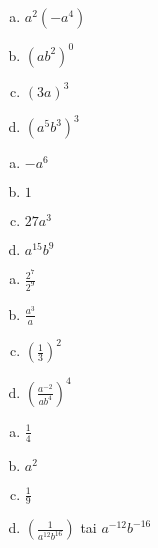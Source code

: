 \begin{tehtavasivu}
        
    \begin{tehtava}%
        \begin{enumerate}[a)]
        	\item $a^2(-a^4) $ 
        	\item $(ab^2)^0$ 
        	\item $(3a)^3$ 
        	\item $(a^5b^3)^3$
		\end{enumerate}        
        \begin{vastaus}
        \begin{enumerate}[a)]
            \item $-a^6$ 
            \item $1$ 
            \item $27a^3$ 
            \item $a^{15}b^9$
        \end{enumerate}
        \end{vastaus}
    \end{tehtava} 
    
    \begin{tehtava}%
        \begin{enumerate}[a)]
        	\item $\frac{2^7}{2^9}$ 
        	\item $\frac{a^3}{a}$ 
        	\item $\left(\frac{1}{3}\right)^2$ 
        	\item $\left(\frac{a^{-2}}{ab^4}\right)^4$
		\end{enumerate}        
        \begin{vastaus}
        \begin{enumerate}[a)]
            \item $\frac{1}{4}$ 
            \item $a^2$ 
            \item $\frac{1}{9} $ 
            \item $ \left(\frac{1}{a^{12}b^{16}}\right)$ tai $a^{-12}b^{-16}$
        \end{enumerate}
        \end{vastaus}
    \end{tehtava}     

\end{tehtavasivu}